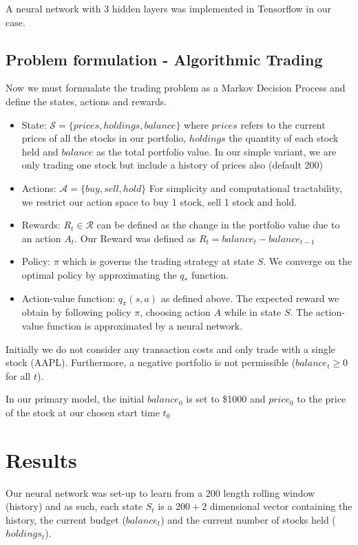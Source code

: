 \documentclass[12pt, authoryear]{elsarticle}
\begin{document}
A neural network with 3 hidden layers was implemented in Tensorflow in our case.


\subsection{Problem formulation - Algorithmic Trading}
Now we must formualate the trading problem as a Markov Decision Process and define the states, actions and rewards.

\begin{itemize}
	\item State: $\mathcal{S} = \{prices,holdings,balance\} $ where $prices$ refers to the current prices of all the stocks in our portfolio, $holdings$ the quantity of each stock held and $balance$ as the total portfolio value. In our simple variant, we are only trading one stock but include a history of prices also (default 200)
	\item Actions: $\mathcal{A} = \{buy,sell,hold\}$ For simplicity and computational tractability, we restrict our action space to buy 1 stock, sell 1 stock and hold.
	\item Rewards: $R_{t} \in \mathcal{R}$ can be defined as the change in the portfolio value due to an action $A_{t}$. Our Reward was defined as $R_{t} = balance_{t} - balance_{t-1}$
	\item Policy: $\pi$ which is governs the trading strategy at state $S$. We converge on the optimal policy by approximating the $q_{*}$ function.
	\item Action-value function: $q_{\pi}(s,a)$ as defined above. The expected reward we obtain by following policy $\pi$, choosing action $A$ while in state $S$. The action-value function is approximated by a neural network.
\end{itemize}

Initially we do not consider any transaction costs and only trade with a single stock (AAPL). Furthermore, a negative portfolio is not permissible ($balance_{t} \geq 0$ for all $t$).

In our primary model, the initial $balance_{0}$ is set to \$1000 and $price_{0}$ to the price of the stock at our chosen start time $t_{0}$ 

\section{Results}

Our neural network was set-up to learn from a 200 length rolling window (history) and as such, each state $S_{t}$ is a $200+2$ dimensional vector containing the history, the current budget ($balance_{t}$) and the current number of stocks held ($holdings_{t}$).
\end{document}
